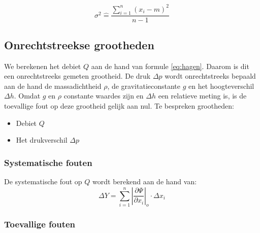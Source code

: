 \begin{equation}
    \sigma^{2} \hat{=} \frac{\sum\limits_{i=1}^n (x_i - m)^2}{n - 1}
\end{equation}


\subsection{Onrechtstreekse grootheden}

We berekenen het debiet $Q$ aan de hand van formule \eqref{eq:hagen}. Daarom is dit een onrechtstreeks gemeten grootheid.
De druk $\Delta p$ wordt onrechtstreeks bepaald aan de hand de massadichtheid $\rho$, de gravitatieconstante $g$ en het hoogteverschil $\Delta h$. Omdat $g$ en $\rho$ constante waardes zijn en $\Delta h$ een relatieve meting is, is de toevallige fout op deze grootheid gelijk aan nul.
Te bespreken grootheden:
\begin{itemize}
    \item Debiet $Q$
    \item Het drukverschil $\Delta p$
\end{itemize}

\subsubsection{Systematische fouten}
De systematische fout op $Q$ wordt berekend aan de hand van:
\begin{equation}
    \Delta Y = \sum\limits_{i=1}^n \left|\frac{\partial \Psi}{\partial x_i}\right|_o \cdot \Delta x_i
\end{equation}

\subsubsection{Toevallige fouten}

